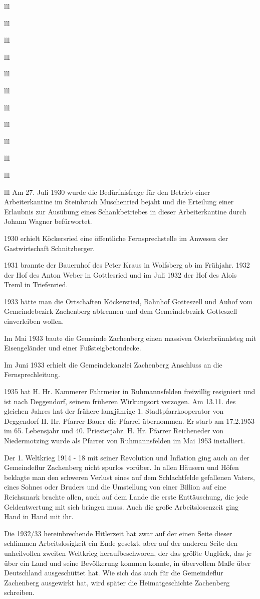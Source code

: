 \documentclass[12pt,a4pager]{book}
\begin{document}
\begin{tabuluar}{lll}
\begin{tabuluar}{lll}
\begin{tabuluar}{lll}
\begin{tabuluar}{lll}
\begin{tabuluar}{lll}
\begin{tabuluar}{lll}
\begin{tabuluar}{lll}
\begin{tabuluar}{lll}
\begin{tabuluar}{lll}
\begin{tabuluar}{lll}
\begin{tabuluar}{lll}
\begin{tabuluar}{lll}
Am 27. Juli 1930 wurde die Bedürfnisfrage für den Betrieb einer Arbeiterkantine
im Steinbruch Muschenried bejaht und die Erteilung einer Erlaubnis zur Ausübung
eines Schankbetriebes in dieser Arbeiterkantine durch Johann Wagner befürwortet.

1930 erhielt Köckersried eine öffentliche Fernsprechstelle im Anwesen der
Gastwirtschaft Schnitzberger.

1931 brannte der Bauernhof des Peter Kraus in Wolfsberg ab im Frühjahr. 1932 der
Hof des Anton Weber in Gottlesried und im Juli 1932 der Hof des Alois Treml in
Triefenried.

1933 hätte man die Ortschaften Köckersried, Bahnhof Gotteszell und Auhof vom
Gemeindebezirk Zachenberg abtrennen und dem Gemeindebezirk Gotteszell
einverleiben wollen.

Im Mai 1933 baute die Gemeinde Zachenberg einen massiven Osterbrünnlsteg mit
Eisengeländer und einer Fußsteigbetondecke.

Im Juni 1933 erhielt die Gemeindekanzlei Zachenberg Anschluss an die
Fernsprechleitung.

1935 hat H. Hr. Kammerer Fahrmeier in Ruhmannsfelden freiwillig resigniert und
ist nach Deggendorf, seinem früheren Wirkungsort verzogen. Am 13.11. des
gleichen Jahres hat der frühere langjährige 1. Stadtpfarrkooperator von
Deggendorf H. Hr. Pfarrer Bauer die Pfarrei übernommen. Er starb am 17.2.1953 im
65. Lebensjahr und 40. Priesterjahr. H. Hr. Pfarrer Reicheneder von
Niedermotzing wurde als Pfarrer von Ruhmannsfelden im Mai 1953 installiert.

Der 1. Weltkrieg 1914 - 18 mit seiner Revolution und Inflation ging auch an der
Gemeindeflur Zachenberg nicht spurlos vorüber. In allen Häusern und Höfen
beklagte man den schweren Verlust eines auf dem Schlachtfelde gefallenen Vaters,
eines Sohnes oder Bruders und die Umstellung von einer Billion auf eine
Reichsmark brachte allen, auch auf dem Lande die erste Enttäuschung, die jede
Geldentwertung mit sich bringen muss. Auch die große Arbeitslosenzeit ging Hand
in Hand mit ihr.

Die 1932/33 hereinbrechende Hitlerzeit hat zwar auf der einen Seite dieser
schlimmen Arbeitslosigkeit ein Ende gesetzt, aber auf der anderen Seite den
unheilvollen zweiten Weltkrieg heraufbeschworen, der das größte Unglück, das je
über ein Land und seine Bevölkerung kommen konnte, in übervollem Maße über
Deutschland ausgeschüttet hat. Wie sich das auch für die Gemeindeflur Zachenberg
ausgewirkt hat, wird später die Heimatgeschichte Zachenberg schreiben.


\end{tabuluar}
\end{tabuluar}
\end{tabuluar}
\end{tabuluar}
\end{tabuluar}
\end{tabuluar}
\end{tabuluar}
\end{tabuluar}
\end{tabuluar}
\end{tabuluar}
\end{tabuluar}
\end{tabuluar}
\end{document}
